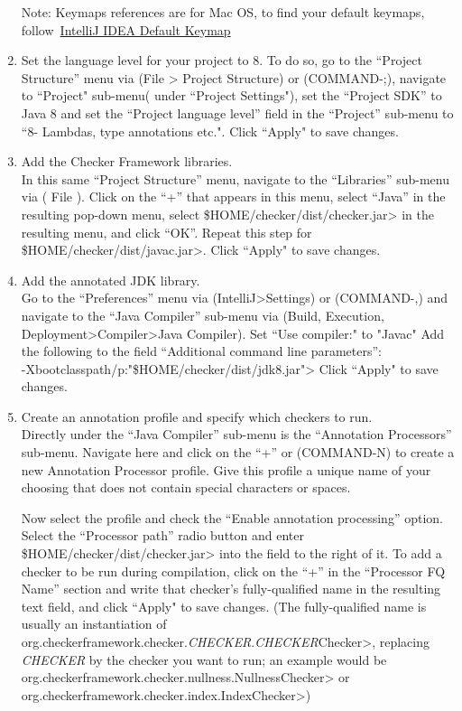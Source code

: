 \begin{enumerate}

Note: Keymaps references are for Mac OS, to find your default keymaps,
follow~\href{https://resources.jetbrains.com/storage/products/intellij-idea/docs/IntelliJIDEA_ReferenceCard.pdf}{IntelliJ IDEA Default Keymap}
\item
  Set the language level for your project to 8.
  To do so, go to the ``Project Structure'' menu via (File > Project Structure) or
  (COMMAND-;), navigate to ``Project" sub-menu( under ``Project Settings"),
  set the “Project SDK” to Java 8 and set the ``Project language level'' field in the
  ``Project'' sub-menu to ``8- Lambdas, type annotations etc.". Click ``Apply" to save changes.


\item
  Add the Checker Framework libraries.\\
  In this same ``Project Structure'' menu, navigate to the ``Libraries'' sub-menu via ( File ).
  Click on the ``+'' that appears in this menu, select ``Java'' in the resulting pop-down menu,
  select \<\${HOME}/checker/dist/checker.jar> in the resulting menu,
  and click ``OK''. Repeat this step for
  \<\${HOME}/checker/dist/javac.jar>.
  Click ``Apply" to save changes.

\item
  Add the annotated JDK library.\\
  Go to the ``Preferences'' menu via (IntelliJ>Settings) or (COMMAND-,) and
  navigate to the ``Java Compiler'' sub-menu via (Build, Execution,
  Deployment>Compiler>Java Compiler). Set ``Use compiler:" to "Javac"  Add the following to the field
  ``Additional command line parameters'': \\
  \<-Xbootclasspath/p:"\${HOME}/checker/dist/jdk8.jar">
  Click ``Apply" to save changes.

\item\label{adding-annotatedjdk}
  Create an annotation profile and specify which checkers to run.\\
  Directly under the ``Java Compiler'' sub-menu is the ``Annotation
  Processors'' sub-menu. Navigate here and click on the ``+'' or (COMMAND-N) to create
  a new Annotation Processor profile.  Give this profile a unique name of your
  choosing that does not contain special characters or spaces.

  Now select the profile and check the ``Enable annotation processing''
  option. Select the ``Processor path'' radio button and enter
  \<\${HOME}/checker/dist/checker.jar> into the field to the right
  of it. To add a checker to be run during compilation, click on the
  ``+'' in the ``Processor FQ Name'' section and write that checker's
  fully-qualified name in
  the resulting text field, and click ``Apply" to save changes.
  (The fully-qualified name is usually an instantiation of
  \<org.checkerframework.checker.\emph{CHECKER}.\emph{CHECKER}Checker>,
  replacing \emph{CHECKER} by the checker you
  want to run; an example would be
  \<org.checkerframework.checker.nullness.NullnessChecker> or \<org.checkerframework.checker.index.IndexChecker>)


\end{enumerate}
